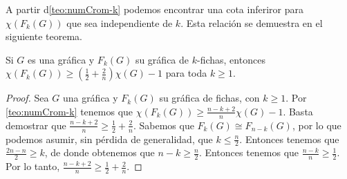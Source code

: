 A partir d\cref{teo:numCrom-k} podemos encontrar una cota inferiror
para $\chi(F_k(G))$ que sea independiente de $k$. Esta relaci\'on se demuestra
en el siguiente teorema.

\begin{teorema}
\label{teo:numCrom indep-k}
    Si $G$ es una gr\'afica y $F_k(G)$ su gr\'afica de $k$-fichas, entonces
    $\chi (F_k(G)) \geq (\frac{1}{2}+ \frac{2}{n})\chi(G) -1 $ para toda $k \geq
    1$.
\end{teorema}
    
\begin{proof}
    Sea $G$ una gr\'afica y $F_k(G)$ su gr\'afica de fichas, con $k \geq 1$. Por
    \cref{teo:numCrom-k} tenemos que $\chi(F_k(G)) \geq \frac{n-k+2}{n} \chi(G)
    -1$. Basta demostrar que $\frac{n-k+2}{n} \geq \frac{1}{2}+\frac{2}{n}$.
    Sabemos que $F_k(G) \cong F_{n-k}(G)$, por lo que podemos asumir, sin
    p\'erdida de generalidad, que $k\leq \frac{n}{2}$. Entonces tenemos que
    $\frac{2n-n}{2}\geq k$, de donde obtenemos que $n-k \geq \frac{n}{2}$.
    Entonces tenemos que $\frac{n-k}{n}\geq \frac{1}{2}$. Por lo tanto,
    $\frac{n-k+2}{n} \geq \frac{1}{2}+\frac{2}{n}$.
\end{proof}